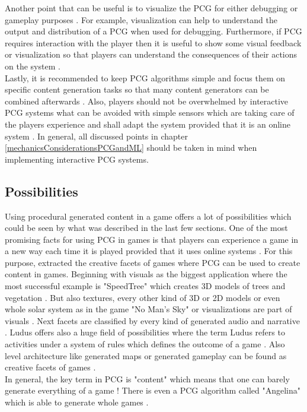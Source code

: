 \documentclass[MGS,Master,english]{twbook}%
\begin{document}
Another point that can be useful is to visualize the PCG for either debugging or gameplay purposes \cite{pcg::book}. For example, visualization can help to understand the output and distribution of a PCG when used for debugging. Furthermore, if PCG requires interaction with the player then it is useful to show some visual feedback or visualization so that players can understand the consequences of their actions on the system \cite{pcg::endlessWeb}. \\
Lastly, it is recommended to keep PCG algorithms simple and focus them on specific content generation tasks so that many content generators can be combined afterwards \cite{pcg::book}. Also, players should not be overwhelmed by interactive PCG systems what can be avoided with simple sensors which are taking care of the players experience and shall adapt the system provided that it is an online system \cite{pcg::shortHistoryOfDynamicAndPCG}.  In general, all discussed points in chapter \ref{mechanicsConsiderationsPCGandML} should be taken in mind when implementing interactive PCG systems.

\subsection{Possibilities}
Using procedural generated content in a game offers a lot of possibilities which could be seen by what was described in the last few sections. One of the most promising facts for using PCG in games is that players can experience a game in a new way each time it is played provided that it uses online systems \cite{pcg::gamasutra::tips}. For this purpose, \cite{pcg::computationalGameCreativity} extracted the creative facets of games where PCG can be used to create content in games. Beginning with visuals as the biggest application where the most successful example is "SpeedTree" \cite{speedTree} which creates \ac{3D} models of trees and vegetation \cite{pcg::computationalGameCreativity}. But also textures, every other kind of 3D or \ac{2D} models or even whole solar system as in the game "No Man's Sky" \cite{noMansSky} or visualizations are part of visuals \cite{pcg::computationalGameCreativity}. Next facets are classified by every kind of generated audio and narrative \cite{pcg::computationalGameCreativity}. Ludus offers also a huge field of possibilities where the term Ludus refers to activities under a system of rules which defines the outcome of a game \cite{pcg::computationalGameCreativity}. Also level architecture like generated maps or generated gameplay can be found as creative facets of games \cite{pcg::computationalGameCreativity}.\\
In general, the key term in PCG is "content" which means that one can barely generate everything of a game \cite{pcg::book}! There is even a PCG algorithm called "Angelina" which is able to generate whole games \cite{pcg::angelina}.
\end{document}
